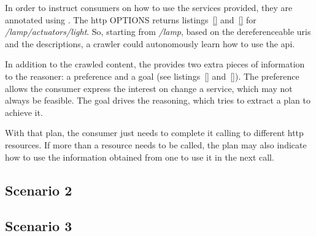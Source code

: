 
In order to instruct consumers on how to use the services provided, they are annotated using \restdesc{}.
The \acs{http} OPTIONS returns listings~\ref{} and~\ref{} for \emph{/lamp/actuators/light}.
So, starting from \emph{/lamp}, based on the dereferenceable \acsp{uri} \citep{sauermann_cool_2008} and the descriptions, a crawler could autonomously learn how to use the \acs{api}. %

In addition to the crawled content, the \consc{} provides two extra pieces of information to the reasoner: a preference and a goal (see listings~\ref{} and~\ref{}).
The preference allows the consumer express the interest on change a service, which may not always be feasible.
The goal drives the reasoning, which tries to extract a plan to achieve it.

With that plan, the consumer just needs to complete it calling to different \acs{http} resources.
If more than a resource needs to be called, the plan may also indicate how to use the information obtained from one to use it in the next call.




\subsection{Scenario 2}
\label{sec:actuation_scn2}



\subsection{Scenario 3}
\label{sec:actuation_scn3}



